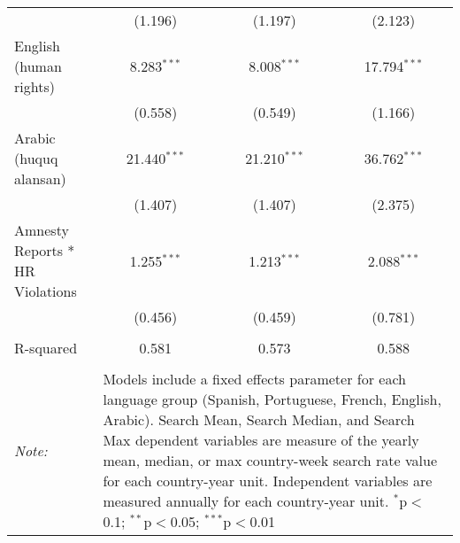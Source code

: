 \begin{table}[!htbp]
\begin{tabular}{@{\extracolsep{5pt}}lccc}
  & (1.196) & (1.197) & (2.123) \\ 
  English (human rights) & 8.283$^{***}$ & 8.008$^{***}$ & 17.794$^{***}$ \\ 
  & (0.558) & (0.549) & (1.166) \\ 
  Arabic (huquq alansan) & 21.440$^{***}$ & 21.210$^{***}$ & 36.762$^{***}$ \\ 
  & (1.407) & (1.407) & (2.375) \\ 
  Amnesty Reports * HR Violations & 1.255$^{***}$ & 1.213$^{***}$ & 2.088$^{***}$ \\ 
  & (0.456) & (0.459) & (0.781) \\ 
 \hline \\[-1.8ex] 
R-squared  & 0.581 & 0.573 & 0.588 \\ 
\hline 
\hline \\[-1.8ex] 
\textit{Note:}  & \multicolumn{3}{l}{\parbox[t]{8cm}{Models include a fixed effects parameter for each language group (Spanish, Portuguese, French, English, Arabic). Search Mean, Search Median, and Search Max dependent variables are measure of the yearly mean, median, or max country-week search rate value for each country-year unit. Independent variables are measured annually for each country-year unit. $^{*}$p$<$0.1; $^{**}$p$<$0.05; $^{***}$p$<$0.01}} \\ 
\end{tabular} 
\end{table} 
